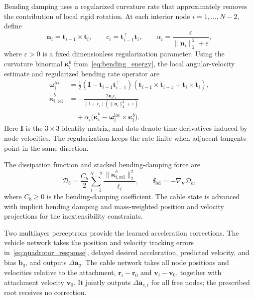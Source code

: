 \documentclass[letterpaper, 10 pt, conference]{ieeeconf}
\begin{document}
Bending damping uses a regularized curvature rate that
approximately removes the contribution of local rigid rotation.
At each interior node $i=1,\ldots,N-2$, define
\[
\mathbf n_i=\mathbf t_{i-1}\times\mathbf t_i,
\qquad
c_i=\mathbf t_{i-1}^\top\mathbf t_i,
\qquad
\alpha_i=
\frac{\varepsilon}{\|\mathbf n_i\|_2^2+\varepsilon},
\]
where $\varepsilon>0$ is a fixed dimensionless regularization
parameter.
Using the curvature binormal
$\boldsymbol\kappa_i^b$ from~\eqref{eq:bending_energy},
the local angular-velocity estimate and regularized bending
rate operator are
\begin{equation}
\begin{aligned}
\boldsymbol\omega_i^{\mathrm{loc}}
&=\tfrac12(\mathbf I-\mathbf t_{i-1}\mathbf t_{i-1}^\top)
(\mathbf t_{i-1}\times\dot{\mathbf t}_{i-1}
+\mathbf t_i\times\dot{\mathbf t}_i),\\
\dot{\boldsymbol\kappa}_{i,\mathrm{rel}}^b
&=-\frac{2\mathbf n_i\dot c_i}
{(1+c_i)(\|\mathbf n_i\|_2^2+\varepsilon)}\\
&\quad+\alpha_i\bigl(\dot{\boldsymbol\kappa}_i^b
-\boldsymbol\omega_i^{\mathrm{loc}}\times\boldsymbol\kappa_i^b\bigr).
\end{aligned}
\label{eq:regularized_bending_rate}
\end{equation}
Here $\mathbf I$ is the $3\times3$ identity matrix, and dots
denote time derivatives induced by node velocities.
The regularization keeps the rate finite when adjacent tangents
point in the same direction.

The dissipation function and stacked bending-damping force are
\begin{equation}
\mathcal D_b=\frac{C_b}{2}
\sum_{i=1}^{N-2}\frac{\|\dot{\boldsymbol\kappa}_{i,\mathrm{rel}}^b\|_2^2}{\bar\ell_i},
\qquad
\mathbf f_{\mathrm{bd}}=-\nabla_{\mathbf v}\mathcal D_b,
\label{eq:bending_damping}
\end{equation}
where $C_b\geq0$ is the bending-damping coefficient.
The cable state is advanced with implicit bending damping and
mass-weighted position and velocity projections for the
inextensibility constraints.

Two multilayer perceptrons provide the learned acceleration
corrections. The vehicle network takes the position and velocity
tracking errors in~\eqref{eq:quadrotor_response}, delayed desired
acceleration, predicted velocity, and bias $\mathbf b_q$,
and outputs $\Delta\mathbf a_q$.
The cable network takes all node positions and velocities
relative to the attachment,
$\mathbf r_i-\mathbf r_0$ and $\mathbf v_i-\mathbf v_0$,
together with attachment velocity $\mathbf v_0$.
It jointly outputs $\Delta\mathbf a_{c,i}$ for all free nodes;
the prescribed root receives no correction.
\end{document}
